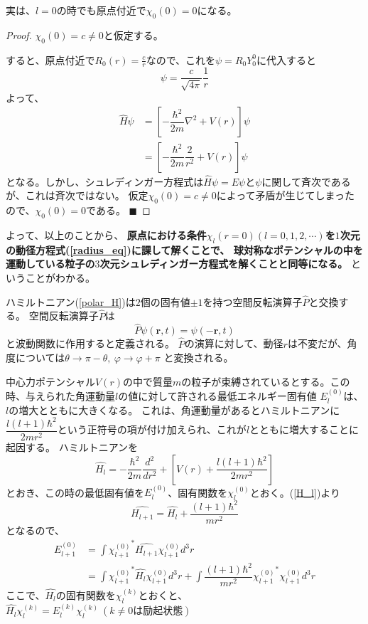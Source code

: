 \documentclass[a4paper,16pt]{jsarticle}
\newtheorem{proof}{証明}
\newcommand{\qed}{\qquad $\blacksquare$}
\begin{document}
実は、$l=0$の時でも原点付近で$\chi_0(0) = 0$になる。
\begin{proof}
	$\chi_0(0) = c \neq 0$と仮定する。

	すると、原点付近で$R_0(r) = \frac{c}{r}$なので、これを$\psi = R_0Y_0^0$に代入すると
	\begin{equation}
		\psi = \dfrac{c}{\sqrt{4\pi}}\dfrac{1}{r}
	\end{equation}
	よって、
	\begin{align}
		\hat{H}\psi &= \left[-\dfrac{\hbar^2}{2m}\nabla^2 + V(r)\right]\psi \\
		&= \left[ -\dfrac{\hbar^2}{2m}\dfrac{2}{r^2} + V(r)\right]\psi
	\end{align}
	となる。しかし、シュレディンガー方程式は$\hat{H}\psi = E\psi$と$\psi$に関して斉次であるが、これは斉次ではない。
	仮定$\chi_0(0) = c \neq 0$によって矛盾が生じてしまったので、$\chi_0(0) = 0$である。
	\qed
\end{proof}

よって、以上のことから、
{\bf 原点における条件$\chi_l(r = 0)(l = 0,1,2,\cdots)$を$1$次元の動径方程式(\ref{radius_eq})に課して解くことで、
球対称なポテンシャルの中を運動している粒子の$3$次元シュレディンガー方程式を解くことと同等になる。}
ということがわかる。

ハミルトニアン(\ref{polar_H})は$2$個の固有値$\pm1$を持つ空間反転演算子$\hat{P}$と交換する。
空間反転演算子$\hat{P}$は
\begin{equation}
	\hat{P}\psi(\bm{r},t) = \psi(-\bm{r},t)
\end{equation}
と波動関数に作用すると定義される。
$\hat{P}$の演算に対して、動径$r$は不変だが、角度については$\theta \to \pi - \theta,~\varphi \to \varphi + \pi$
と変換される。

中心力ポテンシャル$V(r)$の中で質量$m$の粒子が束縛されているとする。この時、与えられた角運動量$l$の値に対して許される最低エネルギー固有値
$E_l^{(0)}$は、$l$の増大とともに大きくなる。
これは、角運動量があるとハミルトニアンに$\dfrac{l(l+1)\hbar^2}{2mr^2}$という正符号の項が付け加えられ、これが$l$とともに増大することに起因する。
ハミルトニアンを
\begin{equation}
	\label{H_l}
	\hat{H_l} = -\dfrac{\hbar^2}{2m}\dfrac{d^2}{dr^2} + \left[ V(r) + \dfrac{l(l+1)\hbar^2}{2mr^2} \right]
\end{equation}
とおき、この時の最低固有値を$E_l^{(0)}$、固有関数を$\chi_l^{(0)}$とおく。(\ref{H_l})より
\begin{equation}
	\hat{H_{l+1}} = \hat{H_l} + \dfrac{(l+1)\hbar^2}{mr^2}
\end{equation}
となるので、
\begin{align}
	E_{l+1}^{(0)}
	&= \int {\chi_{l+1}^{(0)}}^* \hat{H_{l+1}} \chi_{l+1}^{(0)} d^3r \\
	\label{chiHchi}
	&= \int {\chi_{l+1}^{(0)}}^* \hat{H_l} \chi_{l+1}^{(0)} d^3r + \int \dfrac{(l+1)\hbar^2}{mr^2} {\chi_{l+1}^{(0)}}^* \chi_{l+1}^{(0)} d^3r
\end{align}
ここで、$\hat{H_l}$の固有関数を$\chi_l^{(k)}$とおくと、$\hat{H_l}\chi_l^{(k)} = E_l^{(k)}\chi_l^{(k)}~(k\neq 0は励起状態)$
\end{document}
